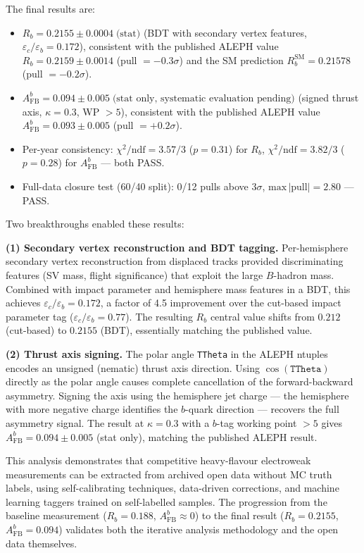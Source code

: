\documentclass[11pt,a4paper]{article}
\begin{document}
The final results are:
\begin{itemize}
\item $R_b = 0.2155 \pm 0.0004\;\text{(stat)}$
  (BDT with secondary vertex features,
  $\varepsilon_c/\varepsilon_b = 0.172$),
  consistent with the published ALEPH value
  $R_b = 0.2159 \pm 0.0014$ (pull $= -0.3\sigma$) and the SM
  prediction $R_b^\text{SM} = 0.21578$ (pull $= -0.2\sigma$).
\item $A_\text{FB}^b = 0.094 \pm 0.005\;\text{(stat only, systematic evaluation pending)}$
  (signed thrust axis, $\kappa = 0.3$, WP $> 5$),
  consistent with the published ALEPH value
  $A_\text{FB}^b = 0.093 \pm 0.005$ (pull $= +0.2\sigma$).
\item Per-year consistency:
  $\chi^2/\text{ndf} = 3.57/3$ ($p = 0.31$) for $R_b$,
  $\chi^2/\text{ndf} = 3.82/3$ ($p = 0.28$) for $A_\text{FB}^b$
  --- both PASS.
\item Full-data closure test (60/40 split): 0/12 pulls above
  $3\sigma$, $\text{max}\,|\text{pull}| = 2.80$ --- PASS.
\end{itemize}

Two breakthroughs enabled these results:

\textbf{(1) Secondary vertex reconstruction and BDT tagging.}
Per-hemisphere secondary vertex reconstruction from displaced
tracks provided discriminating features (SV mass, flight
significance) that exploit the large $B$-hadron mass.
Combined with impact parameter and hemisphere mass features in a
BDT, this achieves $\varepsilon_c/\varepsilon_b = 0.172$, a
factor of 4.5 improvement over the cut-based impact parameter tag
($\varepsilon_c/\varepsilon_b = 0.77$).
The resulting $R_b$ central value shifts from $0.212$ (cut-based)
to $0.2155$ (BDT), essentially matching the published value.

\textbf{(2) Thrust axis signing.}
The polar angle \texttt{TTheta} in the ALEPH ntuples encodes an
unsigned (nematic) thrust axis direction.
Using $\cos(\texttt{TTheta})$ directly as the polar angle causes
complete cancellation of the forward-backward asymmetry.
Signing the axis using the hemisphere jet charge --- the hemisphere
with more negative charge identifies the $b$-quark direction ---
recovers the full asymmetry signal.
The result at $\kappa = 0.3$ with a $b$-tag working point
$> 5$ gives $A_\text{FB}^b = 0.094 \pm 0.005$ (stat only),
matching the published ALEPH result.

This analysis demonstrates that competitive heavy-flavour
electroweak measurements can be extracted from archived open data
without MC truth labels, using self-calibrating techniques,
data-driven corrections, and machine learning taggers trained on
self-labelled samples.
The progression from the baseline measurement
($R_b = 0.188$, $A_\text{FB}^b \approx 0$) to the final result
($R_b = 0.2155$, $A_\text{FB}^b = 0.094$) validates both the
iterative analysis methodology and the open data themselves.
\end{document}
